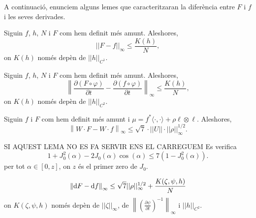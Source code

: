 A continuació, enunciem alguns lemes que caracteritzaran la diferència entre $F$ i $f$ i les seves derivades.

\begin{lema}
    \label{lema:lema2}
    Siguin $f$, $h$, $N$ i $F$ com hem definit més amunt. Aleshores,
    \begin{equation*}
        ||F-f||_\infty \le \frac{K(h)}{N},
    \end{equation*}
    on $K(h)$ només depèn de $||h||_{C^1}$.
\end{lema}

\begin{lema}
    \label{lema:lema3}
    Siguin $f$, $h$, $N$ i $F$ com hem definit més amunt. Aleshores,
    \begin{equation*}
        \left\|\frac{\partial (F\circ \varphi)}{\partial t}-\frac{\partial (f\circ \varphi)}{\partial t}\right\|_\infty \le \frac{K(h)}{N},
    \end{equation*}
    on $K(h)$ només depèn de $||h||_{C^2}$.
\end{lema}

\begin{lema}
    \label{lema:lema4}
    Siguin $f$ i $F$ com hem definit més amunt i $\mu = f^*\langle\cdot, \cdot\rangle + \rho\ell\otimes\ell$. Aleshores,
    \begin{equation*}
        \left\|W\cdot F-W\cdot f\right\|_\infty \le \sqrt7\cdot||U||\cdot||\rho||^{1/2}_\infty.
    \end{equation*}
\end{lema}

\begin{lema}
    {\color{blue} SI AQUEST LEMA NO ES FA SERVIR ENS EL CARREGUEM}
    Es verifica
    \begin{equation*}
        1+J_0^2(\alpha)-2J_0(\alpha)\cos(\alpha) \le 7(1-J_0^2(\alpha)).
    \end{equation*}
    per tot $\alpha\in[0,z]$, on $z$ és el primer zero de $J_0$.
\end{lema}

\begin{lema}
    \label{lema:lema6}
    \begin{equation*}
        \left\| \text dF -\text df \right\|_\infty \le \sqrt{7}||\rho||^{1/2}_\infty + \frac{K(\zeta,\psi,h)}{N}
    \end{equation*}
    on $K(\zeta,\psi,h)$ només depèn de $||\zeta||_\infty$, de $\left\|\left(  \frac{\partial\psi}{\partial t}\right)^{-1}\right\|_\infty$ i $||h||_{C^2}$.
\end{lema}

